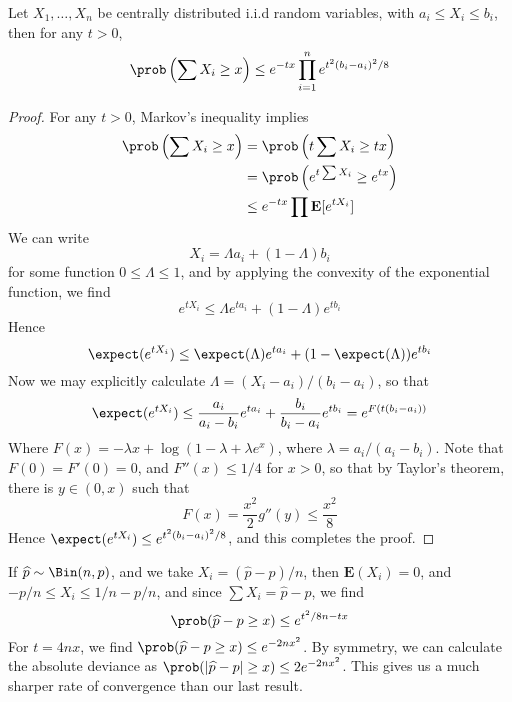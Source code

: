 \begin{theorem}
    Let $X_1, \dots, X_n$ be centrally distributed i.i.d random variables, with $a_i \leq X_i \leq b_i$, then for any $t > 0$,
    \[ \prob \left( \sum X_i \geq x \right) \leq e^{-tx} \prod_{i = 1}^n e^{t^2 (b_i - a_i)^2/8} \]
\end{theorem}
\begin{proof}
    For any $t > 0$, Markov's inequality implies
    \begin{align*}
        \prob \left( \sum X_i \geq x \right) &= \prob \left( t \sum X_i \geq tx \right)\\
        &= \prob \left( e^{t \sum X_i} \geq e^{tx} \right)\\
        &\leq e^{-tx} \prod \mathbf{E}[e^{t X_i}]
    \end{align*}
    We can write
    \[ X_i = \Lambda a_i + (1 - \Lambda) b_i \]
    for some function $0 \leq \Lambda \leq 1$, and by applying the convexity of the exponential function, we find
    \[ e^{tX_i} \leq \Lambda e^{t a_i} + (1 - \Lambda) e^{t b_i} \]
    Hence
    \[ \expect(e^{tX_i}) \leq \expect(\Lambda) e^{t a_i} + (1 - \expect(\Lambda)) e^{t b_i} \]
    Now we may explicitly calculate $\Lambda = (X_i - a_i)/(b_i - a_i)$, so that
    \[ \expect(e^{tX_i}) \leq \frac{a_i}{a_i - b_i} e^{t a_i} + \frac{b_i}{b_i - a_i} e^{t b_i} = e^{F(t(b_i - a_i))} \]
    Where $F(x) = - \lambda x + \log(1 - \lambda + \lambda e^x)$, where $\lambda = a_i/(a_i - b_i)$. Note that $F(0) = F'(0) = 0$, and $F''(x) \leq 1/4$ for $x > 0$, so that by Taylor's theorem, there is $y \in (0,x)$ such that
    \[ F(x) = \frac{x^2}{2} g''(y) \leq \frac{x^2}{8} \]
    Hence $\expect(e^{tX_i}) \leq e^{t^2(b_i - a_i)^2/8}$, and this completes the proof.
\end{proof}

\begin{example}
    If $\widehat{p} \sim \Bin(n,p)$, and we take $X_i = (\widehat{p} - p)/n$, then $\mathbf{E}(X_i) = 0$, and $-p/n \leq X_i \leq 1/n-p/n$, and since $\sum X_i = \widehat{p} - p$, we find
    \[ \prob(\widehat{p} - p \geq x) \leq e^{t^2/8n - tx} \]
    For $t = 4nx$, we find $\prob(\widehat{p} - p \geq x) \leq e^{-2nx^2}$. By symmetry, we can calculate the absolute deviance as $\prob(|\widehat{p} - p| \geq x) \leq 2e^{-2nx^2}$. This gives us a much sharper rate of convergence than our last result.
\end{example}

